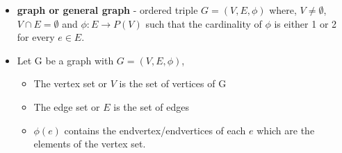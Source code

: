 \begin{itemize}
 \item \textbf{graph or general graph} - ordered triple $G=(V,E,\phi)$ where, $V\neq\emptyset$, $V \cap E = \emptyset$ and $\phi:E \rightarrow P(V)$ such that the cardinality of $\phi$ is either 1 or 2 for every $e \in E$.
 \item Let G be a graph with $G = (V,E,\phi)$,
	\begin{itemize}
		\item The vertex set or $V$ is the set of vertices of G
		\item The edge set or $E$ is the set of edges
		\item $\phi(e)$ contains the endvertex/endvertices of each $e$ which are the elements of the vertex set. 
	\end{itemize}	 
\begin{figure}[h]
\centering
{}
\end{figure}
\end{itemize}
